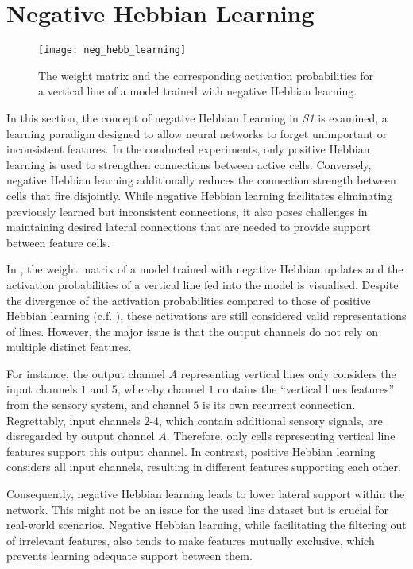 \chapter{Negative Hebbian Learning}
%
\begin{figure}[h]
    \centering
    \texttt{[image: neg\_hebb\_learning]}
    \caption[Weight matrix and activations with negative Hebbian learning]{The weight matrix and the corresponding activation probabilities for a vertical line of a model trained with negative Hebbian learning.}
\end{figure}
%
In this section, the concept of negative Hebbian Learning in \emph{S1} is examined, a learning paradigm designed to allow neural networks to forget unimportant or inconsistent features. 
In the conducted experiments, only positive Hebbian learning  is used to strengthen connections between active cells.
Conversely, negative Hebbian learning additionally reduces the connection strength between cells that fire disjointly.
While negative Hebbian learning facilitates eliminating previously learned but inconsistent connections, it also poses challenges in maintaining desired lateral connections that are needed to provide support between feature cells.


In , the weight matrix of a model trained with negative Hebbian updates and the activation probabilities of a vertical line fed into the model is visualised.
Despite the divergence of the activation probabilities compared to those of positive Hebbian learning (c.f. ), these activations are still considered valid representations of lines.
However, the major issue is that the output channels do not rely on multiple distinct features.

For instance, the output channel $A$ representing vertical lines only considers the input channels $1$ and $5$, whereby channel $1$ contains the ``vertical lines features'' from the sensory system, and channel $5$ is its own recurrent connection.
Regrettably, input channels $2$-$4$, which contain additional sensory signals, are disregarded by output channel $A$. Therefore, only cells representing vertical line features support this output channel.
In contrast, positive Hebbian learning considers all input channels, resulting in different features supporting each other.

Consequently, negative Hebbian learning leads to lower lateral support within the network.
This might not be an issue for the used line dataset but is crucial for real-world scenarios.
Negative Hebbian learning, while facilitating the filtering out of irrelevant features, also tends to make features mutually exclusive, which prevents learning adequate support between them.

